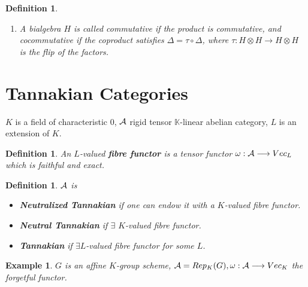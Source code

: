 \documentclass[11pt]{article}
\newtheorem{dfn}[thm]{Definition}
\newtheorem{ex}[thm]{Example}
\newcommand{\bbk}{\mathbb K}
\newcommand{\cala}{{\cal A}}
\newcommand{\lrta}{\longrightarrow}
\begin{document}
\begin{dfn}
\begin{enumerate}[label=(\arabic*)]
\begin{enumerate}[label=(c)]
\[\begin{tikzcd}
    H\ar[rr,"\epsilon"]\ar[ur,"\Delta"]\ar[dr,"\Delta"]& & k\ar[rr,"\eta"] & & H\\
    & H\otimes H\ar[rr,"Id\otimes S"] & & H\otimes H\ar[ur, "\nabla"] &
    \end{tikzcd}
    \]
\end{enumerate}
\item A bialgebra $H$ is called commutative if the product is commutative, and cocommutative if the coproduct satisfies $\Delta=\tau\circ \Delta$, where $\tau:H\otimes H\lrta H\otimes H$ is the flip of the factors.
\end{enumerate}
\end{dfn}

\section{Tannakian Categories}
$K$ is a field of characteristic 0, $\cala$ rigid tensor $\bbk$-linear abelian category, $L$ is an extension of $K$.
\begin{dfn}
An $L$-valued \textbf{fibre functor }is a tensor functor $\omega:\cala\lrta Vec_L$ which is faithful and exact.
\end{dfn}
\begin{dfn}
$\cala$ is 
\begin{itemize}
    \item \textbf{Neutralized Tannakian} if one can  endow it with a $K$-valued fibre functor.
    \item \textbf{Neutral Tannakian} if $\exists$ $K$-valued fibre functor.
    \item \textbf{Tannakian } if $\exists L$-valued fibre functor for some $L$.
\end{itemize}
\end{dfn}
\begin{ex}
$G$ is an affine $K$-group scheme, $\cala=Rep_K(G),\omega:\cala\lrta Vec_K$ the forgetful functor.
\end{ex}
\end{document}
